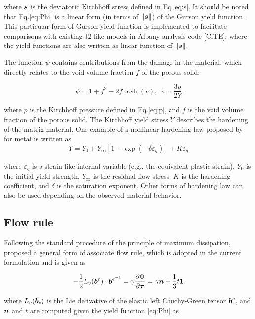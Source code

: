 where ${\boldsymbol{s}}$ is the deviatoric Kirchhoff stress defined in Eq.\eqref{eq:s}. It should be noted that Eq.\eqref{eq:Phi} is a linear form (in terms of $\|{\boldsymbol{s}}\|$) of the Gurson yield function . This particular form of Gurson yield function is implemented to facilitate comparisons with existing J2-like models in Albany analysis code [CITE], where the yield functions are also written as linear function of $\|{\boldsymbol{s}}\|$. 

The function $\psi$ contains contributions from the damage in the material, which directly relates to the void volume fraction $f$ of the porous solid:

\begin{equation}
\psi = 1 + f^2 - 2 f \cosh(v), ~~v=\frac{3p}{2 Y}
\end{equation}

where $p$ is the Kirchhoff pressure defined in Eq.\eqref{eq:p}, and $f$ is the void volume fraction of the porous solid. The Kirchhoff yield stress $Y$ describes the hardening of the matrix material. One example of a nonlinear hardening law proposed by \cite{SimoHughes:98} for metal is written as 
\begin{equation}
Y =  Y_0 + Y_{\infty}\left[ 1-\exp(-\delta\varepsilon_q)\right] + K\varepsilon_q 
\end{equation}

where $\varepsilon_q$ is a strain-like internal variable (e.g., the equivalent plastic strain), $Y_0$ is the initial yield strength, $Y_{\infty}$ is the residual flow stress, $K$ is the hardening coefficient, and $\delta$ is the saturation exponent. Other forms of hardening law can also be used depending on the observed material behavior.

\subsection{Flow rule}
Following the standard procedure of the principle of maximum dissipation, \citep{Simo1992} proposed a general form of associate flow rule, which is adopted in the current formulation and is given as

\begin{equation}\label{eq:flowRule}
-\frac{1}{2}L_v({\boldsymbol{b}}^e)\cdot{\boldsymbol{b}}^{e^{-1}} = \gamma\frac{\partial\Phi}{\partial{\boldsymbol{\tau}}}=\gamma{\boldsymbol{n}} + \frac{1}{3}t\boldsymbol{1}
\end{equation}

where $L_v({\boldsymbol{b}}_e)$ is the Lie derivative of the elastic left Cauchy-Green tensor ${\boldsymbol{b}}^e$, and ${\boldsymbol{n}}$ and $t$ are computed given the yield function \eqref{eq:Phi} as

